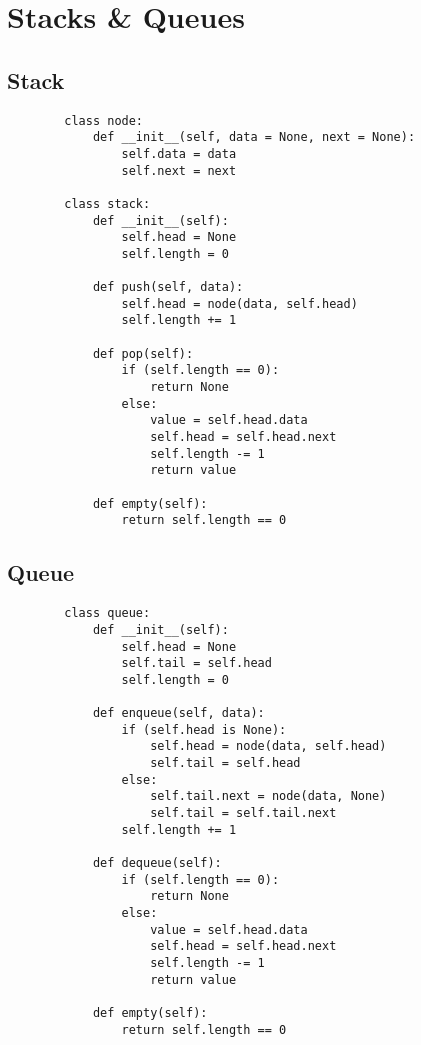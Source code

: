 \newpage

\section[Day 3: Stacks \& Queues]{ Stacks \& Queues }

\subsection{ Stack }

    \begin{lstlisting}
        class node:
            def __init__(self, data = None, next = None):
                self.data = data
                self.next = next

        class stack:
            def __init__(self):
                self.head = None
                self.length = 0

            def push(self, data):
                self.head = node(data, self.head)
                self.length += 1
            
            def pop(self):
                if (self.length == 0):
                    return None
                else:
                    value = self.head.data
                    self.head = self.head.next
                    self.length -= 1
                    return value
            
            def empty(self):
                return self.length == 0
    \end{lstlisting}





\subsection{ Queue }

    \begin{lstlisting}
        class queue:
            def __init__(self):
                self.head = None
                self.tail = self.head
                self.length = 0
            
            def enqueue(self, data):
                if (self.head is None):
                    self.head = node(data, self.head)
                    self.tail = self.head
                else:
                    self.tail.next = node(data, None)
                    self.tail = self.tail.next
                self.length += 1
                
            def dequeue(self):
                if (self.length == 0):
                    return None
                else:
                    value = self.head.data
                    self.head = self.head.next
                    self.length -= 1
                    return value
            
            def empty(self):
                return self.length == 0
    \end{lstlisting}













